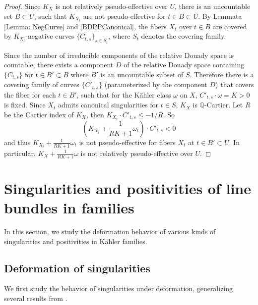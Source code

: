 \documentclass[12pt]{amsart}
\numberwithin{equation}{section}
\theoremstyle{definition}
\theoremstyle{plain}
\newtheorem*{thm A*}{Theorem A}
\newtheorem*{thm B*}{Theorem B}
\newtheorem*{thm C*}{Theorem C}
\newtheorem*{thm D*}{Theorem D}
\theoremstyle{definition}
\renewcommand{\1}{\mathds{1}}
\renewcommand{\>}{\rightarrow}
\newcommand{\Q}{\mathbb Q}
\begin{document}
\begin{proof}
Since $K_{X}$ is not relatively pseudo-effective over $U$, there is an uncountable set $B\subset U$, such that $K_{X_t}$ are not pseudo-effective for $t\in B \subset U$. By Lemmata \ref{Lemma: NegCurve} and \ref{BDPPCanonical}, the fibers $X_t$ over $t\in B$ are covered by $K_{X_t}$-negative curves $\{C_{t,s}\}_{s\in S_t}$, where $S_t$ denotes the covering family. 

Since the number of irreducible components of the relative Douady space is countable, there exists a component $D$ of the relative Douady space containing $\{C_{t,s}\}$ for $t\in B' \subset B$ where $B'$ is an uncountable subset of $S$. Therefore there is a covering family of curves $\{C'_{t,s}\}$ (parameterized by the component $D$) that covers the fiber for each $t\in B'$, such that for the K\"ahler class $\omega$ on $X$, $C'_{t,s}\cdot \omega =K>0$ is fixed. Since $X_t$ admits canonical singularities for $t\in S$, $K_X$ is $\Q$-Cartier. Let $R$ be the Cartier index of $K_X$, then $K_{X_t}\cdot C'_{t,s}\leq - 1/R$. So $$(K_{X_t}+\frac{1}{RK+1}\omega_t)\cdot C'_{t,s}<0$$ and thus $K_{X_t}+\frac{1}{RK+1}\omega_t$ is not pseudo-effective for fibers $X_t$ at $t\in B'\subset U$. In particular, $K_X+\frac{1}{RK+1} \omega $ is not relatively pseudo-effective over $U$. 
\end{proof}




\section{Singularities and positivities of line bundles in  families}\label{Section: SingandPositivty}
In this section, we study the deformation behavior of various kinds of singularities and positivities in K\"ahler families. 
\subsection{Deformation of singularities}
We first study the behavior of singularities under deformation, generalizing several results from \cite{FH11}.
\end{document}
